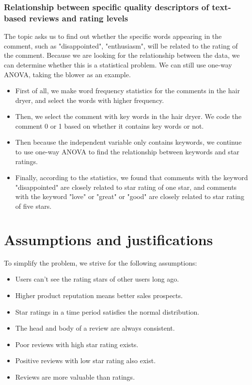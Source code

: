 \documentclass{mcmthesis}
\begin{document}
\subsubsection{Relationship between specific quality descriptors of text-based reviews and rating levels}
The topic asks us to find out whether the specific words appearing in the comment, such as "disappointed", "enthusiasm", will be related to the rating of the comment. Because we are looking for the relationship between the data, we can determine whether this is a statistical problem. We can still use one-way ANOVA, taking the blower as an example.
\begin{itemize}
	\item First of all, we make word frequency statistics for the comments in the hair dryer, and select the words with higher frequency.

	\item Then, we select the comment with key words in the hair dryer. We code the comment 0 or 1 based on whether it contains key words or not.
	
	\item Then because the independent variable only contains keywords, we continue to use one-way ANOVA to find the relationship between keywords and star ratings.
	
	\item Finally, according to the statistics, we found that
	comments with the keyword "disappointed" are closely related to star rating of one star, and comments with the keyword "love" or "great" or "good" are closely related to star rating of five stars.
\end{itemize}




\section{Assumptions and justifications}
To simplify the problem, we strive for the following assumptions:



\begin{itemize}
	\item Users can't see the rating stars of other users long ago. 
	
	\item Higher product reputation means better sales prospects.
	
	\item Star ratings in a time period satisfies the normal distribution.
	\item The head and body of a review are always consistent.
	\item Poor reviews with high star rating exists.
	\item Positive reviews with low star rating also exist.
	\item Reviews are more valuable than ratings.

	
\end{itemize}
\end{document}
